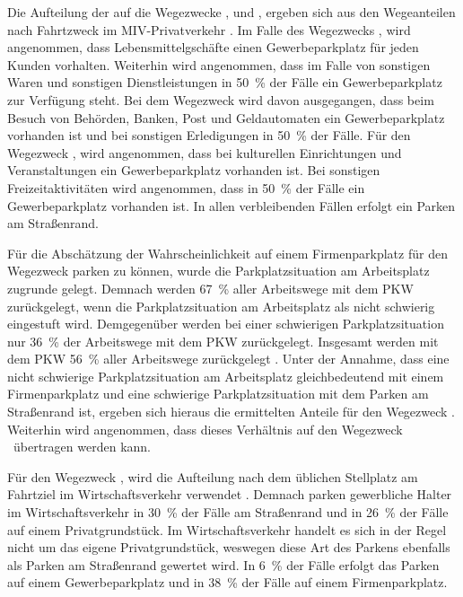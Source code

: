 Die Aufteilung der \UCs auf die Wegezwecke \Einkaufdot, \Erledigung und \Freizeitdot, ergeben sich aus den Wegeanteilen nach Fahrtzweck im \gls{MIV}-Privatverkehr \cite{Rikus2015}.
Im Falle des Wegezwecks \Einkauf, wird angenommen, dass Lebensmittelgschäfte einen Gewerbeparkplatz für jeden Kunden vorhalten.
Weiterhin wird angenommen, dass im Falle von sonstigen Waren und sonstigen Dienstleistungen in \SI{50}{\percent} der Fälle ein Gewerbeparkplatz zur Verfügung steht.
Bei dem Wegezweck \Erledigung wird davon ausgegangen, dass beim Besuch von Behörden, Banken, Post und Geldautomaten ein Gewerbeparkplatz vorhanden ist und bei sonstigen Erledigungen in \SI{50}{\percent} der Fälle.
Für den Wegezweck \Freizeitdot, wird angenommen, dass bei kulturellen Einrichtungen und Veranstaltungen ein Gewerbeparkplatz vorhanden ist.
Bei sonstigen Freizeitaktivitäten wird angenommen, dass in \SI{50}{\percent} der Fälle ein Gewerbeparkplatz vorhanden ist.
In allen verbleibenden Fällen erfolgt ein Parken am Straßenrand.\medskip

Für die Abschätzung der Wahrscheinlichkeit auf einem Firmenparkplatz für den Wegezweck \Arbeit parken zu können, wurde die Parkplatzsituation am Arbeitsplatz zugrunde gelegt.
Demnach werden \SI{67}{\percent} aller Arbeitswege mit dem \gls{PKW} zurückgelegt, wenn die Parkplatzsituation am Arbeitsplatz als nicht schwierig eingestuft wird.
Demgegenüber werden bei einer schwierigen Parkplatzsituation nur \SI{36}{\percent} der Arbeitswege mit dem \gls{PKW} zurückgelegt.
Insgesamt werden mit dem \gls{PKW} \SI{56}{\percent} aller Arbeitswege zurückgelegt \cite{Ecke2020}.
Unter der Annahme, dass eine nicht schwierige Parkplatzsituation am Arbeitsplatz gleichbedeutend mit einem Firmenparkplatz und eine schwierige Parkplatzsituation mit dem Parken am Straßenrand ist, ergeben sich hieraus die ermittelten Anteile für den Wegezweck \Arbeitdot.
Weiterhin wird angenommen, dass dieses Verhältnis auf den Wegezweck \Ausbildung~übertragen werden kann.\medskip

Für den Wegezweck \dienstdot, wird die Aufteilung nach dem üblichen Stellplatz am Fahrtziel im Wirtschaftsverkehr verwendet \cite{Rikus2015}.
Demnach parken gewerbliche Halter im Wirtschaftsverkehr in \SI{30}{\percent} der Fälle am Straßenrand und in \SI{26}{\percent} der Fälle auf einem Privatgrundstück.
Im Wirtschaftsverkehr handelt es sich in der Regel nicht um das eigene Privatgrundstück, weswegen diese Art des Parkens ebenfalls als Parken am Straßenrand gewertet wird.
In \SI{6}{\percent} der Fälle erfolgt das Parken auf einem Gewerbeparkplatz und in \SI{38}{\percent} der Fälle auf einem Firmenparkplatz.\medskip

